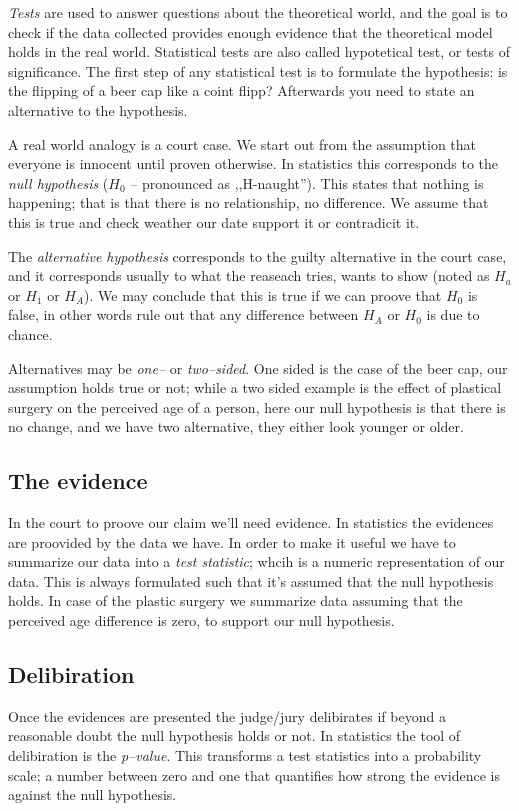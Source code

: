 \emph{Tests} are used to answer questions about the theoretical world, and the
goal is to check if the data collected provides enough evidence that the
theoretical model holds in the real world. Statistical tests are also called
hypotetical test, or tests of significance. The first step of any statistical
test is to formulate the hypothesis: is the flipping of a beer cap like a coint
flipp? Afterwards you need to state an alternative to the hypothesis.

A real world analogy is a court case. We start out from the assumption that
everyone is innocent until proven otherwise. In statistics this corresponds to
the \emph{null hypothesis}  ($H_0$ -- pronounced as ,,H-naught''). This states
that nothing is happening; that is that there is no relationship, no difference.
We assume that this is true and check weather our date support it or contradicit
it.

The \emph{alternative hypothesis} corresponds to the guilty alternative in the
court case, and it corresponds usually to what the reaseach tries, wants to
show (noted as $H_a$ or $H_1$ or $H_A$). We may conclude that this is true if we
can proove that $H_0$ is false, in other words rule out that any difference
between $H_A$ or $H_0$ is due to chance.

Alternatives may be \emph{one--} or \emph{two--sided}. One sided is the case of
the beer cap, our assumption holds true or not; while a two sided example is the
effect of plastical surgery on the perceived age of a person, here our null
hypothesis is that there is no change, and we have two alternative, they either
look younger or older.

\subsection{The evidence}
In the court to proove our claim we'll need evidence. In statistics the
evidences are proovided by the data we have. In order to make it useful we have
to summarize our data into a \emph{test statistic}; whcih is a numeric
representation of our data. This is always formulated such that it's assumed
that the null hypothesis holds. In case of the plastic surgery we summarize data
assuming that the perceived age difference is zero, to support our null
hypothesis.

\subsection{Delibiration}
Once the evidences are presented the judge/jury delibirates if beyond a
reasonable doubt the null hypothesis holds or not. In statistics the tool of
delibiration is the \emph{p--value}. This transforms a test statistics into a
probability scale; a number between zero and one that quantifies how strong the
evidence is against the null hypothesis.

